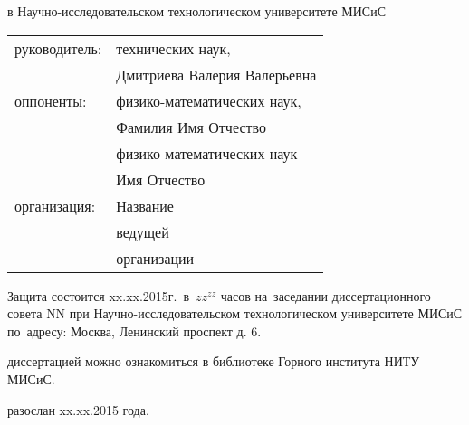  в Научно-исследовательском технологическом университете МИСиС
\vspace{10mm}
\begin{table} [h]  
  \begin{tabular}{ll}
  \fontsize{14pt}{15pt} руководитель: & \fontsize{14pt}{15pt} технических наук,          \\
                        & \fontsize{14pt}{15pt} Дмитриева Валерия Валерьевна
\vspace{3mm} \\
  \fontsize{14pt}{15pt} оппоненты:& \fontsize{14pt}{15pt} физико-математических наук,  \\
                        & \fontsize{14pt}{15pt} Фамилия Имя Отчество \vspace{1mm}                         \\
                        & \fontsize{14pt}{15pt} физико-математических наук                                 \\
                        & \fontsize{14pt}{15pt} Имя Отчество \vspace{3mm}                                   \\
  \fontsize{14pt}{15pt} организация:  & \fontsize{14pt}{15pt}\selectfont Название                           \\
                        & \fontsize{14pt}{15pt}\selectfont ведущей                                                            \\
                        & \fontsize{14pt}{15pt}\selectfont организации
  \end{tabular}  
\end{table}

\vspace{20mm}
\noindent Защита состоится  xx.xx.2015г.~в~$zz^{zz}$ часов на~заседании диссертационного совета $\mbox{NN}$ при Научно-исследовательском технологическом университете МИСиС по~адресу: Москва, Ленинский проспект д. 6.

\vspace{15mm}
 диссертацией можно ознакомиться в библиотеке Горного института НИТУ МИСиС.

\vspace{15mm}
 разослан xx.xx.2015 года.

